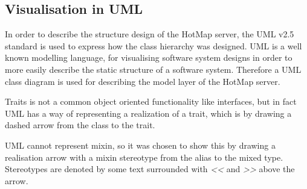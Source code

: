 \subsection{Visualisation in UML}
In order to describe the structure design of the HotMap server, the UML v2.5 standard is used to express how the class hierarchy was designed. UML is a well known modelling language, for visualising software system designs in order to more easily describe the static structure of a software system. Therefore a UML class diagram is used for describing the model layer of the HotMap server.

Traits is not a common object oriented functionality like interfaces, but in fact UML has a way of representing a realization of a trait, which is by drawing a dashed arrow from the class to the trait.

UML cannot represent mixin, so it was chosen to show this by drawing a realisation arrow with a mixin stereotype from the alias to the mixed type. Stereotypes are denoted by some text surrounded with \emph{<<} and \emph{>>} above the arrow.


